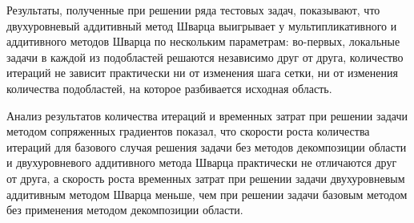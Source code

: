\documentclass[a4paper, 14pt]{extarticle}
\begin{document}
Результаты, полученные при решении ряда тестовых задач, показывают, что двухуровневый аддитивный метод Шварца выигрывает у мультипликативного и аддитивного методов Шварца по нескольким параметрам: во-первых, локальные задачи в каждой из подобластей решаются независимо друг от друга, количество итераций не зависит практически ни от изменения шага сетки, ни от изменения количества подобластей, на которое разбивается исходная область.

Анализ результатов количества итераций и временных затрат при решении задачи методом сопряженных градиентов показал, что скорости роста количества итераций для базового случая решения задачи без методов декомпозиции области и двухуровневого аддитивного метода Шварца практически не отличаются друг от друга, а скорость роста временных затрат при решении задачи двухуровневым аддитивным методом Шварца меньше, чем при решении задачи базовым методом без применения методом декомпозиции области.
\end{document}
